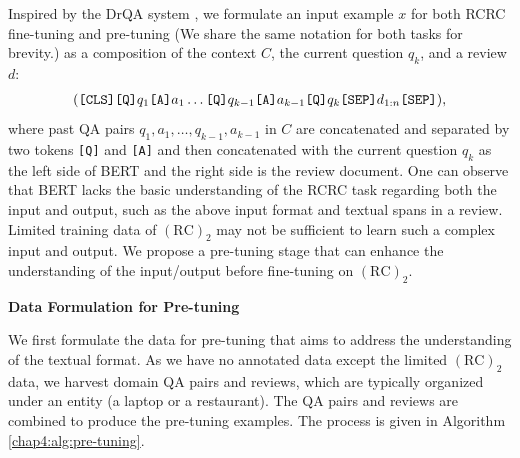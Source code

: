 Inspired by the DrQA system \cite{reddy2018coqa}, we formulate an input example $x$ for both RCRC fine-tuning and pre-tuning (We share the same notation for both tasks for brevity.) as a composition of the context $C$, the current question $q_k$, and a review $d$:
\vspace*{-2mm}
\begin{equation}
\begin{split}
(\texttt{[CLS]} \texttt{[Q]} q_1 \texttt{[A]} a_1 \dots \texttt{[Q]} q_{k-1} \texttt{[A]} a_{k-1} \texttt{[Q]} q_{k} \texttt{[SEP]} d_{1:n} \texttt{[SEP]}),
\nonumber
\end{split}
\vspace*{-5mm}
\end{equation}
where past QA pairs $q_1, a_1, \dots, q_{k-1}, a_{k-1}$ in $C$ are concatenated and separated by two tokens \texttt{[Q]} and \texttt{[A]} and then concatenated with the current question $q_k$ as the left side of BERT and the right side is the review document.
One can observe that BERT lacks the basic understanding of the RCRC task regarding both the input and output, such as the above input format and textual spans in a review. Limited training data of $(\text{RC})_2$ may not be sufficient to learn such a complex input and output.
We propose a pre-tuning stage that can enhance the understanding of the input/output before fine-tuning on $(\text{RC})_2$.

\textbf{Data Formulation for Pre-tuning}
\label{chap4:sec:form}

We first formulate the data for pre-tuning that aims to address the understanding of the textual format.
As we have no annotated data except the limited $(\text{RC})_2$ data, we harvest domain QA pairs and reviews, which are typically organized under an entity (a laptop or a restaurant). The QA pairs and reviews are combined to produce the pre-tuning examples. The process is given in Algorithm \ref{chap4:alg:pre-tuning}.

